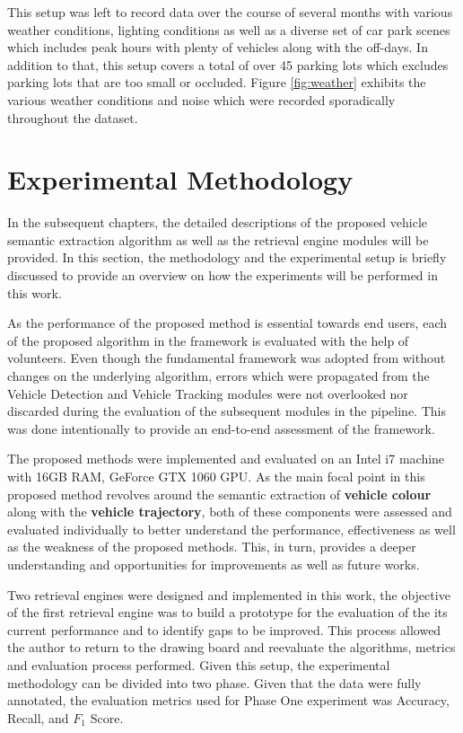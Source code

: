 This setup was left to record data over the course of several months with various weather conditions, lighting conditions as well as a diverse set of car park scenes which includes peak hours with plenty of vehicles along with the off-days. In addition to that, this setup covers a total of over 45 parking lots which excludes parking lots that are too small or occluded. Figure \ref{fig:weather} exhibits the various weather conditions and noise which were recorded sporadically throughout the dataset.





\section{Experimental Methodology}
\label{sec:expmethodology}

In the subsequent chapters, the detailed descriptions of the proposed vehicle semantic extraction algorithm as well as the retrieval engine modules will be provided. In this section, the methodology and the experimental setup is briefly discussed to provide an overview on how the experiments will be performed in this work.

As the performance of the proposed method is essential towards end users, each of the proposed algorithm in the framework is evaluated with the help of volunteers. Even though the fundamental framework was adopted from \cite{lim2017} without changes on the underlying algorithm, errors which were propagated from the Vehicle Detection and Vehicle Tracking modules were not overlooked nor discarded during the evaluation of the subsequent modules in the pipeline. This was done intentionally to provide an end-to-end assessment of the framework. 

The proposed methods were implemented and evaluated on an Intel i7 machine with 16GB RAM, GeForce GTX 1060 GPU. As the main focal point in this proposed method revolves around the semantic extraction of \textbf{vehicle colour} along with the \textbf{vehicle trajectory}, both of these components were assessed and evaluated individually to better understand the performance, effectiveness as well as the weakness of the proposed methods. This, in turn, provides a deeper understanding and opportunities for improvements as well as future works. 

Two retrieval engines were designed and implemented in this work, the objective of the first retrieval engine was to build a prototype for the evaluation of the its current performance and to identify gaps to be improved. This process allowed the author to return to the drawing board and reevaluate the algorithms, metrics and evaluation process performed. Given this setup, the experimental methodology can be divided into two phase. Given that the data were fully annotated, the evaluation metrics used for Phase One experiment was Accuracy, Recall, and $F_1$ Score.


